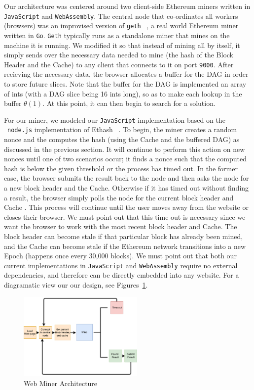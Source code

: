 \documentclass[runningheads]{llncs}
\begin{document}
Our architecture was centered around two client-side Ethereum miners written in \verb|JavaScript| and \verb|WebAssembly|. The central node that co-ordinates all workers (browsers) was an improvised version of \verb|geth| ~\cite{geth}, a real world Ethereum miner written in \verb|Go|. \verb|Geth| typically runs as a standalone miner that mines on the machine it is running. We modified it so that instead of mining all by itself, it simply sends over the necessary data needed to mine (the hash of the Block Header and the Cache) to any client that connects to it on port \verb|9000|. After recieving the necessary data, the browser allocates a buffer for the DAG in order to store future slices. Note that the buffer for the DAG is implemented an array of ints (with a DAG slice being 16 ints long), so as to make each lookup in the buffer $\theta(1)$. At this point, it can then begin to search for a solution. 

For our miner, we modeled our \verb|JavaScript| implementation based on the ~\verb|node.js| implementation of Ethash ~\cite{ethash}. To begin, the miner creates a random nonce and the computes the hash (using the Cache and the buffered DAG) as discussed in the previous section. It will continue to perform this action on new nonces until one of two scenarios occur; it finds a nonce such that the computed hash is below the given threshold or the process has timed out. In the former case, the browser submits the result back to the node and then asks the node for a new block header and the Cache. Otherwise if it has timed out without finding a result, the browser simply polls the node for the current block header and Cache . This process will continue until the user moves away from the website or closes their browser. 
We must point out that this time out is necessary since we want the browser to work with the most recent block header and Cache. The block header can become stale if that particular block has already been mined, and the Cache can become stale if the Ethereum network transitions into a new Epoch (happens once every 30,000 blocks). 
We must point out that both our current implementations in \verb|JavaScript| and \verb|WebAssembly| require no external dependencies, and therefore can be directly embedded into any website. For a diagramatic view our our design, see Figures~\ref{fig:hybridArchitecture}.

\begin{figure}[h]
\centering
\includegraphics[width=230px,keepaspectratio]{Hybrid-Miner.pdf}
\caption{\label{fig:hybridArchitecture} Web Miner Architecture}
\end{figure}
\end{document}
